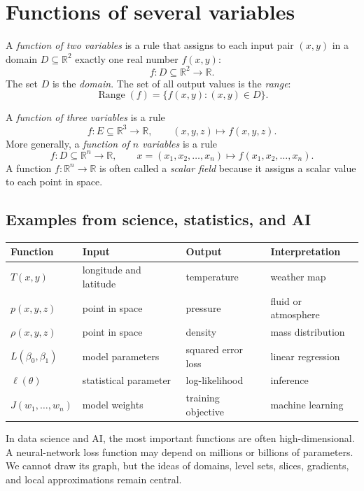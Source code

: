 \documentclass[11pt]{article}
\newcommand{\R}{\mathbb R}
\newcommand{\Range}{\operatorname{Range}}
\begin{document}
\section{Functions of several variables}

A \emph{function of two variables} is a rule that assigns to each input pair $(x,y)$ in a domain $D\subseteq \R^2$ exactly one real number $f(x,y)$:
\[
f:D\subseteq \R^2\to \R.
\]
The set $D$ is the \emph{domain}. The set of all output values is the \emph{range}:
\[
\Range(f)=\{f(x,y):(x,y)\in D\}.
\]

A \emph{function of three variables} is a rule
\[
f:E\subseteq \R^3\to \R,\qquad (x,y,z)\mapsto f(x,y,z).
\]
More generally, a \emph{function of $n$ variables} is a rule
\[
f:D\subseteq \R^n\to \R,\qquad x=(x_1,x_2,\ldots,x_n)\mapsto f(x_1,x_2,\ldots,x_n).
\]
A function $f:\R^n\to\R$ is often called a \emph{scalar field} because it assigns a scalar value to each point in space.

\subsection*{Examples from science, statistics, and AI}

\begin{center}
\begin{tabular}{@{}>{\raggedright\arraybackslash}p{}p{}p{}p{}@{}}
\toprule
Function & Input & Output & Interpretation \\
\midrule
$T(x,y)$ & longitude and latitude & temperature & weather map \\
$p(x,y,z)$ & point in space & pressure & fluid or atmosphere \\
$\rho(x,y,z)$ & point in space & density & mass distribution \\
$L(\beta_0,\beta_1)$ & model parameters & squared error loss & linear regression \\
$\ell(\theta)$ & statistical parameter & log-likelihood & inference \\
$J(w_1,\ldots,w_n)$ & model weights & training objective & machine learning \\
\bottomrule
\end{tabular}
\end{center}

\begin{tipbox}
In data science and AI, the most important functions are often high-dimensional. A neural-network loss function may depend on millions or billions of parameters. We cannot draw its graph, but the ideas of domains, level sets, slices, gradients, and local approximations remain central.
\end{tipbox}
\end{document}
